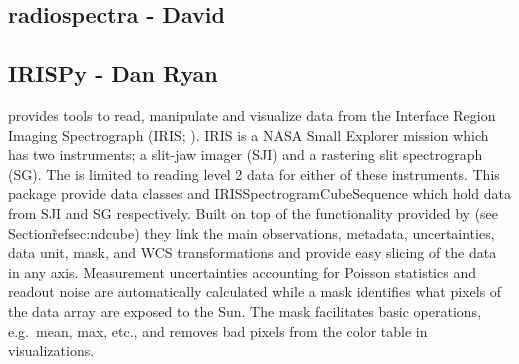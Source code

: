 \subsection{radiospectra - David}


\subsection{IRISPy - Dan Ryan}
\label{sec:irispy}

 provides tools to read, manipulate and visualize data from the Interface Region Imaging Spectrograph (IRIS; \citealt{DePontieu2014}). 
IRIS is a NASA Small Explorer mission which has two instruments; a slit-jaw imager (SJI) and a rastering slit spectrograph (SG). 
The  is limited to reading level 2 data for either of these instruments. 
This package provide data classes  and {IRISSpectrogramCubeSequence} which hold data from SJI and SG respectively.
Built on top of the functionality provided by  (see Section\~ref{sec:ndcube}) they link the main observations, metadata, uncertainties, data unit, mask, and WCS transformations and provide easy slicing of the data in any axis. 
Measurement uncertainties accounting for Poisson statistics and readout noise are automatically calculated while a mask identifies what pixels of the data array are exposed to the Sun. 
The mask facilitates basic operations, e.g.\ mean, max, etc., and removes bad pixels from the color table in visualizations.



